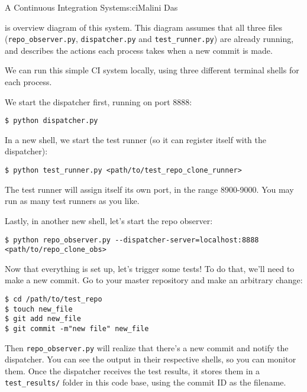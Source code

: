 \begin{aosachapter}{A Continuous Integration System}{s:ci}{Malini Das}
\label{control-flow-diagram}

 is overview diagram of this system.
This diagram assumes that all three files
\newline (\texttt{repo\_observer.py}, \texttt{dispatcher.py} and
\texttt{test\_runner.py}) are already running, and describes the actions
each process takes when a new commit is made.


\label{running-the-code}

We can run this simple CI system locally, using three different terminal
shells for each process.

We start the dispatcher first, running on port 8888:

\begin{verbatim}
$ python dispatcher.py
\end{verbatim}

In a new shell, we start the test runner (so it can register itself with
the dispatcher):

\begin{verbatim}
$ python test_runner.py <path/to/test_repo_clone_runner>
\end{verbatim}

The test runner will assign itself its own port, in the range 8900-9000.
You may run as many test runners as you like.

Lastly, in another new shell, let's start the repo observer:

\begin{verbatim}
$ python repo_observer.py --dispatcher-server=localhost:8888 <path/to/repo_clone_obs>
\end{verbatim}

Now that everything is set up, let's trigger some tests! To do that,
we'll need to make a new commit. Go to your master repository and make
an arbitrary change:

\begin{verbatim}
$ cd /path/to/test_repo
$ touch new_file
$ git add new_file
$ git commit -m"new file" new_file
\end{verbatim}

Then \texttt{repo\_observer.py} will realize that there's a new commit
and notify the dispatcher. You can see the output in their respective
shells, so you can monitor them. Once the dispatcher receives the test
results, it stores them in a \texttt{test\_results/} folder in this code
base, using the commit ID as the filename.


\end{aosachapter}
